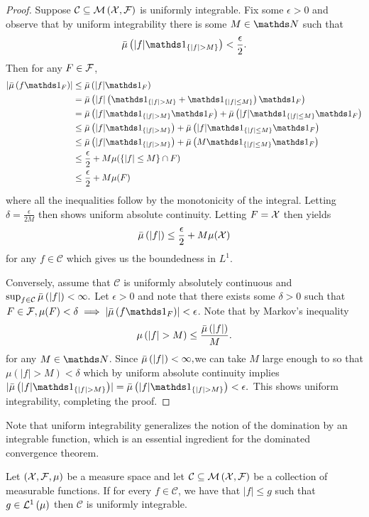 \begin{proof}
Suppose $\mathcal{C}\subseteq\mathcal{M}\left(\mathcal{X},\mathcal{F}\right)$ is uniformly integrable.
Fix some $\epsilon>0$ and observe that by uniform integrability there
is some $M\in\N$ such that 
\[
\lebInt{\mu}{\lvert f\rvert\indicate_{\{\lvert f\rvert>M\}}}<\frac{\epsilon}{2}.
\]
Then for any $F\in\mathcal{F}$,
\begin{align*}
\lvert\lebInt{\mu}{f\indicate_{F}}\rvert & \leq\lebInt{\mu}{\lvert f\rvert\indicate_{F}}\\
 & =\lebInt{\mu}{\lvert f\rvert\left(\indicate_{\{\lvert f\rvert>M\}}+\indicate_{\{\lvert f\rvert\leq M\}}\right)\indicate_{F}}\\
 & =\lebInt{\mu}{\lvert f\rvert\indicate_{\{\lvert f\rvert>M\}}\indicate_{F}}+\lebInt{\mu}{\lvert f\rvert\indicate_{\{\lvert f\rvert\leq M\}}\indicate_{F}}\\
 & \leq\lebInt{\mu}{\lvert f\rvert\indicate_{\{\lvert f\rvert>M\}}}+\lebInt{\mu}{\lvert f\rvert\indicate_{\{\lvert f\rvert\leq M\}}\indicate_{F}}\\
 & \leq\lebInt{\mu}{\lvert f\rvert\indicate_{\{\lvert f\rvert>M\}}}+\lebInt{\mu}{M\indicate_{\{\lvert f\rvert\leq M\}}\indicate_{F}}\\
 & \leq\frac{\epsilon}{2}+M\mu(\{\lvert f\rvert\leq M\}\cap F)\\
 & \leq\frac{\epsilon}{2}+M\mu(F)
\end{align*}
where all the inequalities follow by the monotonicity of the integral.
Letting $\delta=\frac{\epsilon}{2M}$ then shows uniform absolute
continuity. Letting $F=\mathcal{X}$ then yields 
\[
\bar{\mu}\left(\lvert f\rvert\right)\leq\frac{\epsilon}{2}+M\mu(\mathcal{X})
\]
for any $f\in\mathcal{C}$ which gives us the boundedness in $L^{1}$.

Conversely, assume that $\mathcal{C}$ is uniformly absolutely continuous
and $\sup_{f\in\mathcal{C}}\bar{\mu}\left(\lvert f\rvert\right)<\infty.$
Let $\epsilon>0$ and note that there exists some $\delta>0$ such
that $F\in\F,\mu(F)<\delta\implies\lvert\lebInt{\mu}{f\indicate_{F}}\rvert<\epsilon$.
Note that by Markov's inequality
\[
\mu\left(\lvert f\rvert>M\right)\leq\frac{\bar{\mu}\left(\lvert f\rvert\right)}{M}.
\]
for any $M\in\N$. Since $\bar{\mu}\left(\lvert f\rvert\right)<\infty,$we
can take $M$ large enough to so that $\mu\left(\lvert f\rvert>M\right)<\delta$
which by uniform absolute continuity implies $\lvert\lebInt{\mu}{\lvert f\lvert\indicate_{\{\lvert f\rvert>M\}}}\rvert=\lebInt{\mu}{\lvert f\lvert\indicate_{\{\lvert f\rvert>M\}}}<\epsilon.$
This shows uniform integrability, completing the proof.
\end{proof}
Note that uniform integrability generalizes the notion of the domination
by an integrable function, which is an essential ingredient for the
dominated convergence theorem.
\begin{prop}
\label{prop:dominatedImpliesUniformlyIntegrable}Let $\left(\mathcal{X},\mathcal{F},\mu\right)$
be a measure space and let $\mathcal{C}\subseteq\mathcal{M}\left(\mathcal{X},\mathcal{F}\right)$
be a collection of measurable functions. If for every $f\in\mathcal{C}$,
we have that $\lvert f\rvert\leq g$ such that $g\in\mathcal{L}^{1}\left(\mu\right)$ then
$\mathcal{C}$ is uniformly integrable.
\end{prop}

